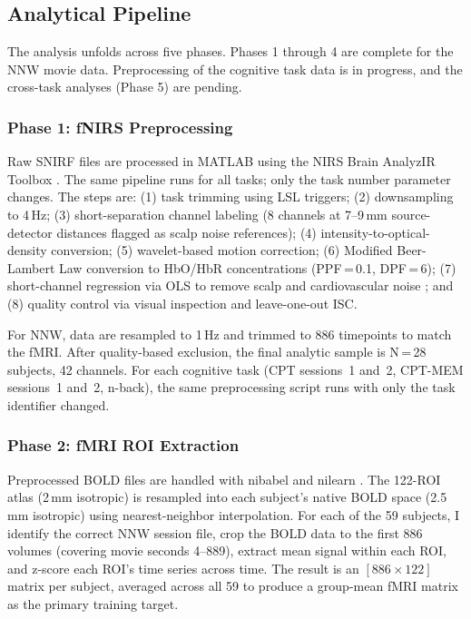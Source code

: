 \subsection{Analytical Pipeline}

The analysis unfolds across five phases. Phases 1 through 4 are complete for the NNW movie data. Preprocessing of the cognitive task data is in progress, and the cross-task analyses (Phase 5) are pending.

\subsubsection{Phase 1: fNIRS Preprocessing}

Raw SNIRF files are processed in MATLAB using the NIRS Brain AnalyzIR Toolbox \citep{santosa2018}. The same pipeline runs for all tasks; only the task number parameter changes. The steps are: (1) task trimming using LSL triggers; (2) downsampling to 4\,Hz; (3) short-separation channel labeling (8 channels at 7--9\,mm source-detector distances flagged as scalp noise references); (4) intensity-to-optical-density conversion; (5) wavelet-based motion correction; (6) Modified Beer-Lambert Law conversion to HbO/HbR concentrations (PPF\,=\,0.1, DPF\,=\,6); (7) short-channel regression via OLS to remove scalp and cardiovascular noise \citep{goodwin2014}; and (8) quality control via visual inspection and leave-one-out ISC.

For NNW, data are resampled to 1\,Hz and trimmed to 886 timepoints to match the fMRI. After quality-based exclusion, the final analytic sample is N\,=\,28 subjects, 42 channels. For each cognitive task (CPT sessions~1 and~2, CPT-MEM sessions~1 and~2, n-back), the same preprocessing script runs with only the task identifier changed.

\subsubsection{Phase 2: fMRI ROI Extraction}

Preprocessed BOLD files are handled with nibabel \citep{brett2020} and nilearn \citep{abraham2014}. The 122-ROI atlas (2\,mm isotropic) is resampled into each subject's native BOLD space (2.5\,mm isotropic) using nearest-neighbor interpolation. For each of the 59 subjects, I identify the correct NNW session file, crop the BOLD data to the first 886 volumes (covering movie seconds 4--889), extract mean signal within each ROI, and z-score each ROI's time series across time. The result is an $[886 \times 122]$ matrix per subject, averaged across all 59 to produce a group-mean fMRI matrix as the primary training target.

